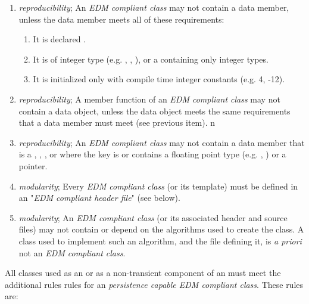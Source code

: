 \documentclass[draftmode]{memarticle}
\newcommand{\EDProduct}{\classname{ED\-Product}}
\begin{document}
\begin{enumerate}
	\item \emph{reproducibility}; An \emph{EDM compliant class} may not contain a  data member, unless the  data member meets all of these requirements:
	\begin{enumerate}
		\item It is declared .

		\item It is of integer type (e.g. , , ), or a  containing only integer types.

		\item  It is initialized only with compile time integer constants (e.g. 4, -12).
	\end{enumerate}

	\item \emph{reproducibility}; A member function of an \emph{EDM compliant class} may not contain a  data object, unless the  data object meets the same requirements that a  data member must meet (see previous item).
n
	\item \emph{reproducibility}; An \emph{EDM compliant class} may not contain a data member that is a , , , or  where the key is or contains a floating point type (e.g. , ) or a pointer.

	\item \emph{modularity}; Every \emph{EDM compliant class} (or its template) must be defined in an "\emph{EDM compliant header file}" (see below).

	\item \emph{modularity}; An \emph{EDM compliant class} (or its associated header and source files) may not contain or depend on the algorithms used to create the class.  A class used to implement such an algorithm, and the file defining it, is \emph{a priori} not an \emph{EDM compliant class}.

\end{enumerate}

All classes used as an \EDProduct or as a non-transient component of an \EDProduct must meet the additional rules rules for an \emph{persistence capable EDM compliant class}.  These rules are:
\end{document}
